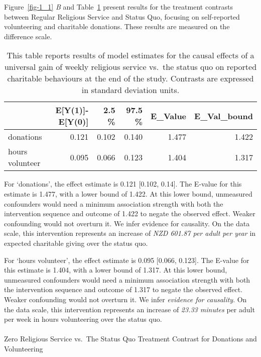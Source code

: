 \documentclass[
  single column]{article}
\makeatletter
\let\oldparagraph\paragraph
\renewcommand{\paragraph}{
    \@ifstar
      \xxxParagraphStar
      \xxxParagraphNoStar
  }
\newcommand{\xxxParagraphStar}[1]{\oldparagraph*{#1}\mbox{}}
\newcommand{\xxxParagraphNoStar}[1]{\oldparagraph{#1}\mbox{}}
\makeatother
\begin{document}
Figure~\ref{fig-1_1} \emph{B} and Table~\ref{tbl-1_2} present results
for the treatment contrasts between Regular Religious Service and Status
Quo, focusing on self-reported volunteering and charitable donations.
These results are measured on the difference scale.

\begin{longtable}[]{@{}lrrrrr@{}}

\caption{\label{tbl-1_2}This table reports results of model estimates
for the causal effects of a universal gain of weekly religious service
vs.~the status quo on reported charitable behaviours at the end of the
study. Contrasts are expressed in standard deviation units.}

\tabularnewline

\toprule\noalign{}
& E{[}Y(1){]}-E{[}Y(0){]} & 2.5 \% & 97.5 \% & E\_Value &
E\_Val\_bound \\
\midrule\noalign{}
\endhead
\bottomrule\noalign{}
\endlastfoot
donations & 0.121 & 0.102 & 0.140 & 1.477 & 1.422 \\
hours volunteer & 0.095 & 0.066 & 0.123 & 1.404 & 1.317 \\

\end{longtable}

For `donations', the effect estimate is 0.121 {[}0.102, 0.14{]}. The
E-value for this estimate is 1.477, with a lower bound of 1.422. At this
lower bound, unmeasured confounders would need a minimum association
strength with both the intervention sequence and outcome of 1.422 to
negate the observed effect. Weaker confounding would not overturn it. We
infer evidence for causality. On the data scale, this intervention
represents an increase of \emph{NZD 601.87 per adult per year} in
expected charitable giving over the status quo.

For `hours volunteer', the effect estimate is 0.095 {[}0.066, 0.123{]}.
The E-value for this estimate is 1.404, with a lower bound of 1.317. At
this lower bound, unmeasured confounders would need a minimum
association strength with both the intervention sequence and outcome of
1.317 to negate the observed effect. Weaker confounding would not
overturn it. We infer \emph{evidence for causality}. On the data scale,
this intervention represents an increase of \emph{23.33 minutes} per
adult per week in hours volunteering over the status quo.

\paragraph{Zero Religious Service vs.~The Status Quo Treatment Contrast
for Donations and
Volunteering}\label{zero-religious-service-vs.-the-status-quo-treatment-contrast-for-donations-and-volunteering}
\end{document}
